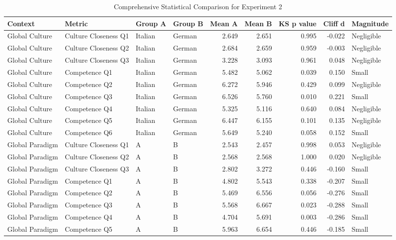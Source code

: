 \begin{table}
\caption{Comprehensive Statistical Comparison for Experiment 2}
\label{tab:exp2_stats}
\begin{tabular}{llllrrrrl}
\toprule
Context & Metric & Group  A & Group  B & Mean  A & Mean  B & KS  p  value & Cliff  d & Magnitude \\
\midrule
Global  Culture & Culture  Closeness  Q1 & Italian & German & 2.649 & 2.651 & 0.995 & -0.022 & Negligible \\
Global  Culture & Culture  Closeness  Q2 & Italian & German & 2.684 & 2.659 & 0.959 & -0.003 & Negligible \\
Global  Culture & Culture  Closeness  Q3 & Italian & German & 3.228 & 3.093 & 0.961 & 0.048 & Negligible \\
Global  Culture & Competence  Q1 & Italian & German & 5.482 & 5.062 & 0.039 & 0.150 & Small \\
Global  Culture & Competence  Q2 & Italian & German & 6.272 & 5.946 & 0.429 & 0.099 & Negligible \\
Global  Culture & Competence  Q3 & Italian & German & 6.526 & 5.760 & 0.010 & 0.221 & Small \\
Global  Culture & Competence  Q4 & Italian & German & 5.325 & 5.116 & 0.640 & 0.084 & Negligible \\
Global  Culture & Competence  Q5 & Italian & German & 6.447 & 6.155 & 0.101 & 0.135 & Negligible \\
Global  Culture & Competence  Q6 & Italian & German & 5.649 & 5.240 & 0.058 & 0.152 & Small \\
Global  Paradigm & Culture  Closeness  Q1 & A & B & 2.543 & 2.457 & 0.998 & 0.053 & Negligible \\
Global  Paradigm & Culture  Closeness  Q2 & A & B & 2.568 & 2.568 & 1.000 & 0.020 & Negligible \\
Global  Paradigm & Culture  Closeness  Q3 & A & B & 2.802 & 3.272 & 0.446 & -0.160 & Small \\
Global  Paradigm & Competence  Q1 & A & B & 4.802 & 5.543 & 0.338 & -0.207 & Small \\
Global  Paradigm & Competence  Q2 & A & B & 5.469 & 6.556 & 0.056 & -0.276 & Small \\
Global  Paradigm & Competence  Q3 & A & B & 5.568 & 6.667 & 0.023 & -0.288 & Small \\
Global  Paradigm & Competence  Q4 & A & B & 4.704 & 5.691 & 0.003 & -0.286 & Small \\
Global  Paradigm & Competence  Q5 & A & B & 5.963 & 6.654 & 0.446 & -0.185 & Small \\

\end{tabular}
\end{table}
